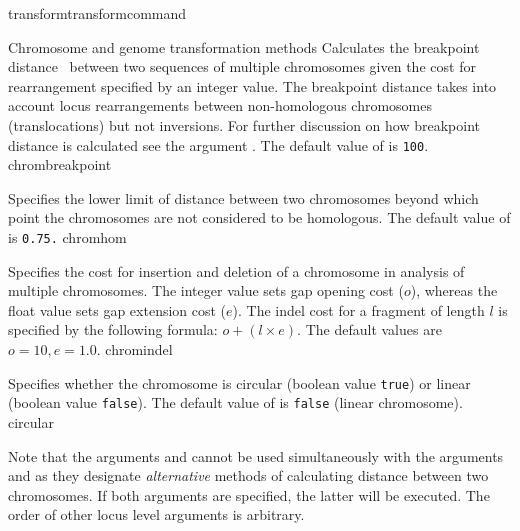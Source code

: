 \begin{command}{transform}{transformcommand}
\begin{arguments}
\begin{argumentgroup}{Chromosome and genome transformation methods}
                {Calculates the breakpoint distance~\cite{blanchetteetal1997}
                between two sequences of multiple chromosomes given the cost for
                rearrangement specified by an integer value. The breakpoint distance
                takes into account locus rearrangements between non-homologous
                chromosomes (translocations) but not inversions. For further discussion on 
                how breakpoint distance is calculated see the argument .  
                The default value of  is \texttt{100}.} 
                {chrombreakpoint}
                    
                {Specifies the lower limit of distance between two chromosomes beyond which 
                point the chromosomes are not considered to be homologous. 
                The default value of  is \texttt{0.75.}}
                {chromhom}
  
                {Specifies the cost for insertion and deletion of a chromosome in analysis of
                multiple chromosomes. The integer value sets gap opening
                cost ($o$), whereas the float value sets gap extension
                cost ($e$).  The indel cost for a fragment of length $l$ is
                specified by the following formula:
                    $o + (l \times e)$. The default values are $o=10, e=1.0$.}
                {chromindel}

                {Specifies whether the chromosome is circular (boolean value
                \texttt{true}) or linear (boolean value \texttt{false}). The
                default value of  is \texttt{false}
                (linear chromosome).}
                {circular}
         
            \begin{statement}
                Note that the arguments  and
                 cannot be used simultaneously
                with the arguments  and
                 as they designate
                \emph{alternative} methods of calculating distance between two
                chromosomes.  If both arguments are specified, the latter will
                be executed. The order of other locus level arguments is
                arbitrary.
            \end{statement}
    

\end{argumentgroup}
\end{arguments}
\end{command}
